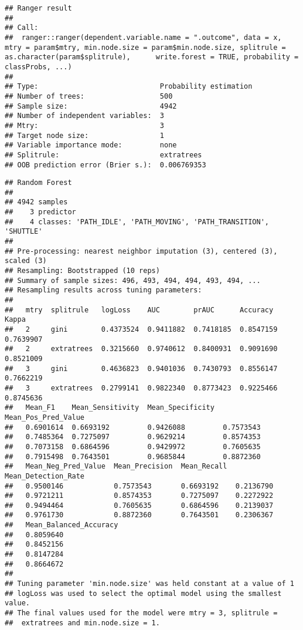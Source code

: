 \documentclass[]{article}
\begin{document}
\begin{verbatim}
## Ranger result
## 
## Call:
##  ranger::ranger(dependent.variable.name = ".outcome", data = x,      mtry = param$mtry, min.node.size = param$min.node.size, splitrule = as.character(param$splitrule),      write.forest = TRUE, probability = classProbs, ...) 
## 
## Type:                             Probability estimation 
## Number of trees:                  500 
## Sample size:                      4942 
## Number of independent variables:  3 
## Mtry:                             3 
## Target node size:                 1 
## Variable importance mode:         none 
## Splitrule:                        extratrees 
## OOB prediction error (Brier s.):  0.006769353
\end{verbatim}

\begin{verbatim}
## Random Forest 
## 
## 4942 samples
##    3 predictor
##    4 classes: 'PATH_IDLE', 'PATH_MOVING', 'PATH_TRANSITION', 'SHUTTLE' 
## 
## Pre-processing: nearest neighbor imputation (3), centered (3), scaled (3) 
## Resampling: Bootstrapped (10 reps) 
## Summary of sample sizes: 496, 493, 494, 494, 493, 494, ... 
## Resampling results across tuning parameters:
## 
##   mtry  splitrule   logLoss    AUC        prAUC      Accuracy   Kappa    
##   2     gini        0.4373524  0.9411882  0.7418185  0.8547159  0.7639907
##   2     extratrees  0.3215660  0.9740612  0.8400931  0.9091690  0.8521009
##   3     gini        0.4636823  0.9401036  0.7430793  0.8556147  0.7662219
##   3     extratrees  0.2799141  0.9822340  0.8773423  0.9225466  0.8745636
##   Mean_F1    Mean_Sensitivity  Mean_Specificity  Mean_Pos_Pred_Value
##   0.6901614  0.6693192         0.9426088         0.7573543          
##   0.7485364  0.7275097         0.9629214         0.8574353          
##   0.7073158  0.6864596         0.9429972         0.7605635          
##   0.7915498  0.7643501         0.9685844         0.8872360          
##   Mean_Neg_Pred_Value  Mean_Precision  Mean_Recall  Mean_Detection_Rate
##   0.9500146            0.7573543       0.6693192    0.2136790          
##   0.9721211            0.8574353       0.7275097    0.2272922          
##   0.9494464            0.7605635       0.6864596    0.2139037          
##   0.9761730            0.8872360       0.7643501    0.2306367          
##   Mean_Balanced_Accuracy
##   0.8059640             
##   0.8452156             
##   0.8147284             
##   0.8664672             
## 
## Tuning parameter 'min.node.size' was held constant at a value of 1
## logLoss was used to select the optimal model using the smallest value.
## The final values used for the model were mtry = 3, splitrule =
##  extratrees and min.node.size = 1.
\end{verbatim}
\end{document}
